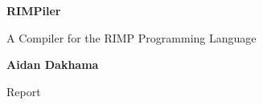 \begin{titlepage}
    \begin{center}
        \vspace*{1cm}

        \textbf{RIMPiler}

        \vspace{0.5cm}
        A Compiler for the RIMP Programming Language

        \vspace{1.5cm}

        \textbf{Aidan Dakhama}

        \vfill

        Report

    \end{center}
\end{titlepage}